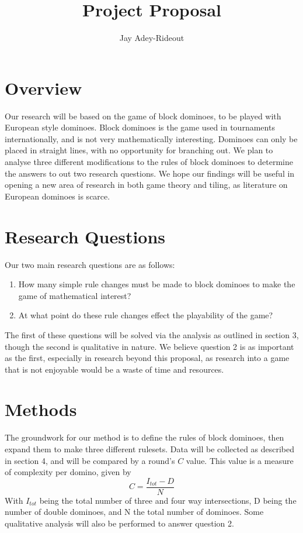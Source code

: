 \documentclass{article}
\title{Project Proposal}
\author{Jay Adey-Rideout}
\begin{document}
\maketitle

\section{Overview}
Our research will be based on the game of block dominoes, to be played with European style dominoes. Block dominoes is the game used in tournaments internationally, and is not very mathematically interesting. Dominoes can only be placed in straight lines, with no opportunity for branching out. We plan to analyse three different modifications to the rules of block dominoes to determine the answers to out two research questions. We hope our findings will be useful in opening a new area of research in both game theory and tiling, as literature on European dominoes is scarce.

\section{Research Questions}
Our two main research questions are as follows:
\begin{enumerate}
    \item How many simple rule changes must be made to block dominoes to make the game of mathematical interest?
    \item At what point do these rule changes effect the playability of the game?
\end{enumerate}
The first of these questions will be solved via the analysis as outlined in section 3, though the second is qualitative in nature. We believe question 2 is as important as the first, especially in research beyond this proposal, as research into a game that is not enjoyable would be a waste of time and resources.

\section{Methods}
The groundwork for our method is to define the rules of block dominoes, then expand them to make three different rulesets. Data will be collected as described in section 4, and will be compared by a round's \(C\) value. This value is a measure of complexity per domino, given by $$C=\frac{I_{tot}-D}{N}$$ With \(I_{tot}\) being the total number of three and four way intersections, D being the number of double dominoes, and N the total number of dominoes. Some qualitative analysis will also be performed to answer question 2.
\end{document}
